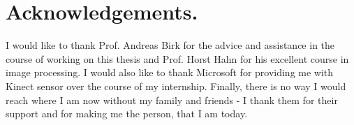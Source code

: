 \documentclass[a4paper,11pt,oneside]{article}
\begin{document}
  \section{Acknowledgements.}
  I would like to thank Prof. Andreas Birk for the advice and assistance in the course of working on this thesis and Prof. Horst Hahn for his excellent course in image processing. I would also like to thank Microsoft for providing me with Kinect sensor over the course of my internship. Finally, there is no way I would reach where I am now without my family and friends - I thank them for their support and for making me the person, that I am today.

  \newpage
  \renewcommand{\refname}{\section{References}}
  
  
  
\end{document}
